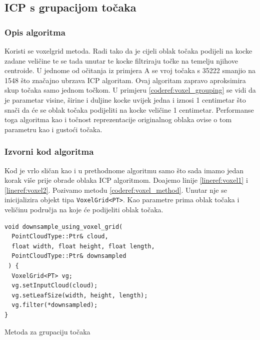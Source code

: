\subsection{ICP s grupacijom točaka}

\subsubsection{Opis algoritma}
Koristi se voxelgrid metoda. Radi tako da je cijeli oblak točaka podijeli na kocke zadane veličine te se tada unutar te kocke filtriraju točke na temelju njihove centroide. U jednome od očitanja iz primjera A se vroj točaka s 35222 smanjio na 1548 što značajno ubrzava ICP algoritam. Ovaj algoritam zapravo aproksimira skup točaka samo jednom točkom. U primjeru \ref{coderef:voxel_grouping} se vidi da je parametar visine, širine i duljine kocke uvijek jedna i iznosi 1 centimetar što snači da će se oblak točaka podijeliti na kocke veličine 1 centimetar. Performanse toga algoritma kao i točnost reprezentacije originalnog oblaka ovise o tom parametru kao i gustoći točaka.


\subsubsection{Izvorni kod algoritma}
Kod je vrlo sličan kao i u prethodnome algoritmu samo što sada imamo jedan korak više prije obrade oblaka ICP algoritmom. Doajemo linije \ref{lineref:voxel1} i \ref{lineref:voxel2}. Pozivamo metodu \ref{coderef:voxel_method}. Unutar nje se inicijalizira objekt tipa \texttt{VoxelGrid<PT>}. Kao parametre prima oblak točaka i veličinu područja na koje će podijeliti oblak točaka.

\begin{listing}[H]
  \begin{verbatim}
void downsample_using_voxel_grid(
  PointCloudType::Ptr& cloud,
  float width, float height, float length,
  PointCloudType::Ptr& downsampled
 ) {
  VoxelGrid<PT> vg;
  vg.setInputCloud(cloud);
  vg.setLeafSize(width, height, length);
  vg.filter(*downsampled);
}
  \end{verbatim}
  \caption{Metoda za grupaciju točaka}
  \label{coderef:voxel_method}
\end{listing}

